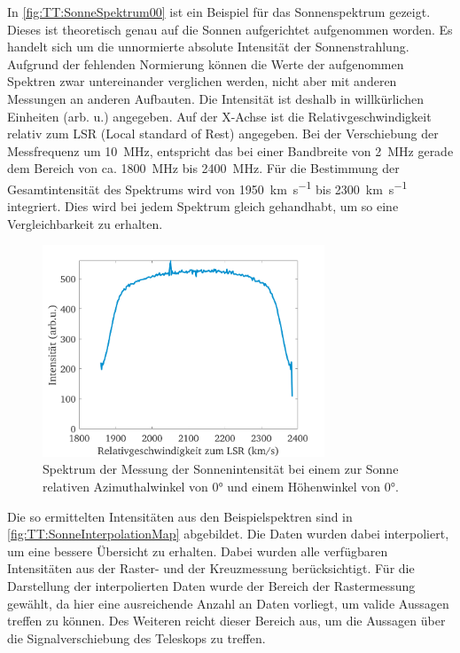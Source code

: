 \documentclass[../../main.tex]{subfiles}
\begin{document}
    In \autoref{fig:TT:SonneSpektrum00} ist ein Beispiel für das Sonnenspektrum gezeigt. Dieses ist theoretisch genau auf die Sonnen aufgerichtet aufgenommen worden. Es handelt sich um die unnormierte absolute Intensität der Sonnenstrahlung. Aufgrund der fehlenden Normierung können die Werte der aufgenommen Spektren zwar untereinander verglichen werden, nicht aber mit anderen Messungen an anderen Aufbauten. Die Intensität ist deshalb in willkürlichen Einheiten (arb. u.) angegeben. Auf der X-Achse ist die Relativgeschwindigkeit relativ zum LSR (Local standard of Rest) angegeben. Bei der Verschiebung der Messfrequenz um \SI{10}{\mega \hertz}, entspricht das bei einer Bandbreite von \SI{2}{\mega \hertz} gerade dem Bereich von ca. \SI{1800}{\mega \hertz} bis \SI{2400}{\mega \hertz}. Für die Bestimmung der Gesamtintensität des Spektrums wird von \SI{1950}{\kilo \metre \per \second} bis \SI{2300}{\kilo \metre \per \second} integriert. Dies wird bei jedem Spektrum gleich gehandhabt, um so eine Vergleichbarkeit zu erhalten.
    \begin{figure}[H]
        \centering
        \includegraphics[width=0.75\textwidth]{Bilddateien/Sun/Raster_spectrum_64867__Fig_1.png}
        \caption{Spektrum der Messung der Sonnenintensität bei einem zur Sonne relativen Azimuthalwinkel von \ang{0} und einem Höhenwinkel von \ang{0}.}
        \label{fig:TT:SonneSpektrum00}
    \end{figure}
    Die so ermittelten Intensitäten aus den Beispielspektren sind in \autoref{fig:TT:SonneInterpolationMap} abgebildet. Die Daten wurden dabei interpoliert, um eine bessere Übersicht zu erhalten. Dabei wurden alle verfügbaren Intensitäten aus der Raster- und der Kreuzmessung berücksichtigt. Für die Darstellung der interpolierten Daten wurde der Bereich der Rastermessung gewählt, da hier eine ausreichende Anzahl an Daten vorliegt, um valide Aussagen treffen zu können. Des Weiteren reicht dieser Bereich aus, um die Aussagen über die Signalverschiebung des Teleskops zu treffen.
\end{document}
